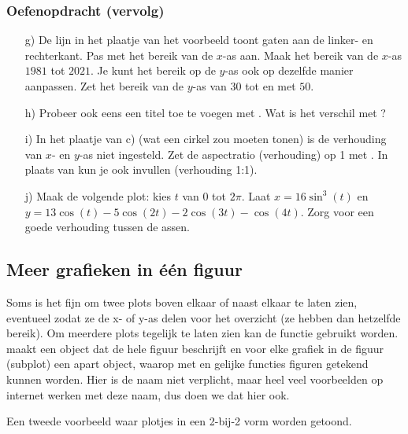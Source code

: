 \documentclass[a4paper,11pt, fleqn]{article}
\begin{document}
\subsubsection*{Oefenopdracht (vervolg)}
\begin{itemize}
	\item[g)] De lijn in het plaatje van het voorbeeld toont gaten aan de linker- en rechterkant. Pas met   het bereik van de $x$-as aan. Maak het bereik van de $x$-as $1981$ tot $2021$. Je kunt het bereik op de $y$-as ook op dezelfde manier aanpassen. Zet het bereik van de $y$-as van $30$ tot en met $50$.
	
	\item[h)] Probeer ook eens een titel toe te voegen met . Wat is het verschil met ?
	
	\item[i)] In het plaatje van c) (wat een cirkel zou moeten tonen) is de verhouding van $x$- en $y$-as niet ingesteld. Zet de aspectratio (verhouding) op 1 met . In plaats van  kun je ook  invullen (verhouding 1:1).
	
	\item[j)] Maak de volgende plot: kies $t$ van $0$ tot $2\pi$. Laat $x = 16 \sin^3(t)$ en $y = 13 \cos(t) - 5 \cos(2t) - 2 \cos(3t) - \cos(4t)$. Zorg voor een goede verhouding tussen de assen.
\end{itemize}

\subsection{Meer grafieken in \'e\'en figuur}
Soms is het fijn om twee plots boven elkaar of naast elkaar te laten zien, eventueel zodat ze de x- of y-as delen voor het overzicht (ze hebben dan hetzelfde bereik). Om meerdere plots tegelijk te laten zien kan de functie  gebruikt worden.  maakt een object dat de hele figuur beschrijft en voor elke grafiek in de figuur (subplot) een apart object, waarop met  en gelijke functies figuren getekend kunnen worden. Hier is de naam  niet verplicht, maar heel veel voorbeelden op internet werken met deze naam, dus doen we dat hier ook.


Een tweede voorbeeld waar plotjes in een 2-bij-2 vorm worden getoond.
\end{document}
